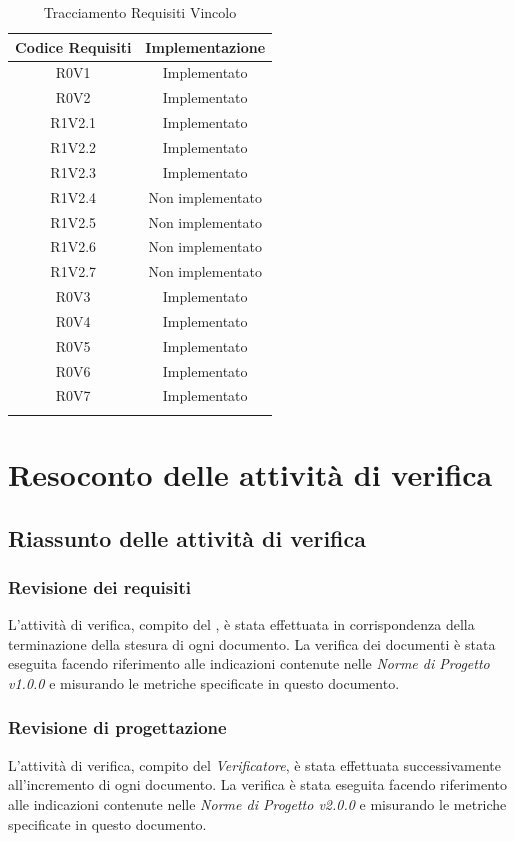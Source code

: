 \begin{longtable}{|c|c|}
	\hline
	\textbf{Codice Requisiti} & \textbf{Implementazione} \\
	\hline
	\endhead
	R0V1 & Implementato\\
	\hline
	R0V2 & Implementato\\
	\hline
	R1V2.1 & Implementato\\
	\hline
	R1V2.2 & Implementato\\
	\hline
	R1V2.3 & Implementato\\
	\hline
	R1V2.4 & Non implementato\\
	\hline
	R1V2.5 & Non implementato\\
	\hline
	R1V2.6 & Non implementato\\
	\hline
	R1V2.7 & Non implementato\\
	\hline
	R0V3 & Implementato\\
	\hline
	R0V4 & Implementato\\
	\hline
	R0V5 & Implementato\\
	\hline
	R0V6 & Implementato\\
	\hline
	R0V7 & Implementato\\
	\hline
	\caption[Tracciamento Requisiti Vincolo]{Tracciamento Requisiti Vincolo}
\end{longtable}
\clearpage


\section{Resoconto delle attività di verifica}
	\subsection{Riassunto delle attività di verifica}
	\subsubsection{Revisione dei requisiti}
	L'attività di verifica, compito del \emph{}, è stata effettuata in corrispondenza della terminazione della stesura di ogni documento. La verifica dei documenti è stata eseguita facendo riferimento alle indicazioni contenute nelle \emph{Norme di Progetto v1.0.0} e misurando le metriche specificate in questo documento.
	\subsubsection{Revisione di progettazione}
	L'attività di verifica, compito del \emph{Verificatore}, è stata effettuata successivamente all'incremento di ogni documento. La verifica è stata eseguita facendo riferimento alle indicazioni contenute nelle \emph{Norme di Progetto v2.0.0} e misurando le metriche specificate in questo documento.

